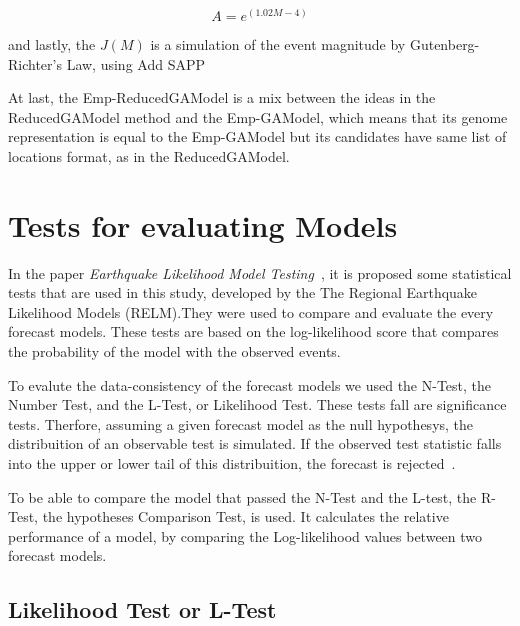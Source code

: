 \begin{equation}
A = e^{(1.02M -4)}
\end{equation}



and lastly, the $J(M)$ is a simulation of the event magnitude by
Gutenberg-Richter's Law, using Add SAPP
%

At last, the Emp-ReducedGAModel is a mix between the ideas in the
ReducedGAModel method and the Emp-GAModel, which means that its genome
representation is equal to the Emp-GAModel but its candidates have
same list of locations format, as in the ReducedGAModel.

\section{Tests for evaluating Models}\label{Tests}

In the paper {\it Earthquake Likelihood Model
  Testing}~\cite{schorlemmer2007earthquake}, it is proposed some
statistical tests that are used in this study, developed by the The
Regional Earthquake Likelihood Models (RELM).They were used to compare
and evaluate the every forecast models. These tests are based on the
log-likelihood score that compares the probability of the model with
the observed events.

To evalute the data-consistency of the forecast models we used the
N-Test, the Number Test, and the L-Test, or Likelihood Test. These
tests fall are significance tests. Therfore, assuming a given forecast
model as the null hypothesys, the distribuition of an observable test
is simulated. If the observed test statistic falls into the upper or
lower tail of this distribuition, the forecast is
rejected~\cite{schorlemmer2010first}.

To be able to compare the model that passed the N-Test and the L-test,
the R-Test, the hypotheses Comparison Test, is used. It calculates the
relative performance of a model, by comparing the Log-likelihood
values between two forecast models.

\subsection{Likelihood Test or L-Test}
 
